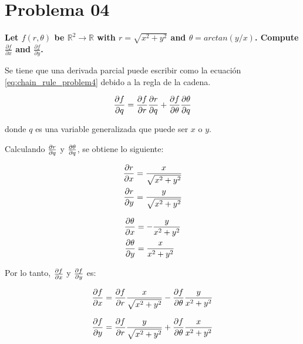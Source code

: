 \section*{Problema 04}

\textbf{Let $f(r,\theta)$ be $\mathbb{R}^2 \rightarrow \mathbb{R}$ with $r=\sqrt{x^2+y^2}$ and $\theta = arctan(y/x)$. Compute $\frac{\partial f}{\partial x}$ and $\frac{\partial f}{\partial y}$.}


Se tiene que una derivada parcial puede escribir como la ecuación \ref{eq:chain_rule_problem4} debido a la regla de la cadena.

\begin{equation}
    \frac{\partial f}{\partial q} = \frac{\partial f}{\partial r}\frac{\partial r}{\partial q} + \frac{\partial f}{\partial \theta}\frac{\partial \theta}{\partial q} \label{eq:chain_rule_problem4}
\end{equation}

donde $q$ es una variable generalizada que puede ser $x$ o $y$.

Calculando $\frac{\partial r}{\partial q}$ y $\frac{\partial \theta}{\partial q}$, se obtiene lo siguiente:

\begin{minipage}{0.45\linewidth}
    \begin{align*}
        \frac{\partial r}{\partial x} & = \frac{x}{\sqrt{x^2+y^2}} \\
        \frac{\partial r}{\partial y} & = \frac{y}{\sqrt{x^2+y^2}}
    \end{align*}
\end{minipage}
\begin{minipage}{0.45\linewidth}
    \begin{align*}
        \frac{\partial \theta}{\partial x} & = -\frac{y}{x^2+y^2} \\
        \frac{\partial \theta}{\partial y} & = \frac{x}{ x^2+y^2}
    \end{align*}
\end{minipage}

Por lo tanto, $\frac{\partial f}{\partial x}$ y $\frac{\partial f}{\partial y}$ es:

\begin{equation*}
    \frac{\partial f}{\partial x} = \frac{\partial f}{\partial r}\frac{x}{\sqrt{x^2+y^2}} - \frac{\partial f}{\partial \theta} \frac{y}{x^2+y^2}
\end{equation*}


\begin{equation*}
    \frac{\partial f}{\partial y} = \frac{\partial f}{\partial r}\frac{y}{\sqrt{x^2+y^2}} + \frac{\partial f}{\partial \theta} \frac{x}{x^2+y^2}
\end{equation*}